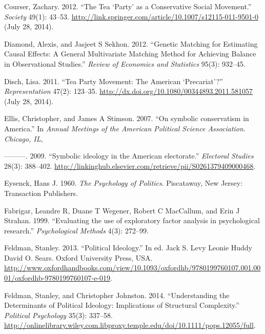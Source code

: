 \documentclass[12pt,]{article}
\begin{document}
Courser, Zachary. 2012. ``The Tea `Party' as a Conservative Social
Movement.'' \emph{Society} 49(1): 43--53.
\url{http://link.springer.com/article/10.1007/s12115-011-9501-0} (July
28, 2014).

Diamond, Alexis, and Jasjeet S Sekhon. 2012. ``Genetic Matching for
Estimating Causal Effects: A General Multivariate Matching Method for
Achieving Balance in Observational Studies.'' \emph{Review of Economics
and Statistics} 95(3): 932--45.

Disch, Lisa. 2011. ``Tea Party Movement: The American `Precariat'?''
\emph{Representation} 47(2): 123--35.
\url{http://dx.doi.org/10.1080/00344893.2011.581057} (July 28, 2014).

Ellis, Christopher, and James A Stimson. 2007. ``On symbolic
conservatism in America.'' In \emph{Annual Meetings of the American
Political Science Association. Chicago, IL},

---------. 2009. ``Symbolic ideology in the American electorate.''
\emph{Electoral Studies} 28(3): 388--402.
\url{http://linkinghub.elsevier.com/retrieve/pii/S0261379409000468}.

Eysenck, Hans J. 1960. \emph{The Psychology of Politics}. Piscataway,
New Jersey: Transaction Publishers.

Fabrigar, Leandre R, Duane T Wegener, Robert C MacCallum, and Erin J
Strahan. 1999. ``Evaluating the use of exploratory factor analysis in
psychological research.'' \emph{Psychological Methods} 4(3): 272--99.

Feldman, Stanley. 2013. ``Political Ideology.'' In ed. Jack S. Levy
Leonie Huddy David O. Sears. Oxford University Press, USA.
\url{http://www.oxfordhandbooks.com/view/10.1093/oxfordhb/9780199760107.001.0001/oxfordhb-9780199760107-e-019}.

Feldman, Stanley, and Christopher Johnston. 2014. ``Understanding the
Determinants of Political Ideology: Implications of Structural
Complexity.'' \emph{Political Psychology} 35(3): 337--58.
\url{http://onlinelibrary.wiley.com.libproxy.temple.edu/doi/10.1111/pops.12055/full}.
\end{document}
